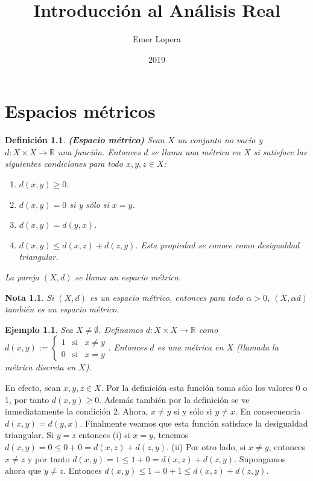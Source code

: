 \documentclass[x11names, 12pt]{book}
\title{Introducción al Análisis Real}
\author{Emer Lopera }
\date{2019}
\newtheorem{definicion}{Definición}
\newtheorem{example}{Ejemplo}
\newtheorem{remark}{Nota}
\begin{document}
\maketitle
\chapter{Espacios métricos}
\begin{definicion}\textbf{(Espacio métrico)}
Sean $X$ un conjunto no vacío y $d:X \times X \to \mathbb{R}$ una función. Entonces $d$ se llama una métrica en $X$ si satisface las siguientes condiciones para todo $x,y,z\in X$:
\begin{enumerate}
    \item $d(x,y)\geq 0$.
    \item $d(x,y)= 0$ si y sólo si $x=y$.
    \item $d(x,y)=d(y,x).$
    \item $d(x,y)\leq d(x,z)+d(z,y).$ Esta propiedad se conoce como desigualdad triangular.
\end{enumerate}
La pareja $(X,d)$ se llama un espacio métrico.
\end{definicion}
\begin{remark}
Si $(X,d)$ es un espacio métrico, entonces para todo $\alpha >0$, $(X,\alpha d)$ también es un espacio métrico.
\end{remark}
\begin{example}
Sea $X\ne \emptyset$. Definamos $d:X\times X \to \mathbb{R}$ como $d(x,y):= \left\{ \begin{array}{rcl}
    1 & \text{si} & x\neq y \\
     0 & \text{si} & x= y
\end{array} \right. .$ Entonces $d$ es una métrica en $X$ (llamada la métrica discreta en $X$).
\end{example}
En efecto, sean $x,y,z \in X$. Por la definición esta función toma sólo los valores 0 o 1, por tanto $d(x,y)\geq 0$. Además también por la definición se ve inmediatamente la condición 2. Ahora,  $x\neq y$ si y sólo si $y\neq x$. En consecuencia $d(x,y)=d(y,x)$. Finalmente veamos que esta función satisface la desigualdad triangular. Si $y=z$ entonces (i) si $x=y$, tenemos $d(x,y)=0\leq 0+0=d(x,z)+d(z,y)$. (ii)
Por otro lado, si $x\neq y$, entonces $x\neq z$ y por tanto $d(x,y)=1\leq 1+0 =d(x,z)+d(z,y)$.  Supongamos ahora que $y\neq z$. Entonces $d(x,y)\leq 1 = 0+1 \leq d(x,z)+d(z,y).$
\end{document}
